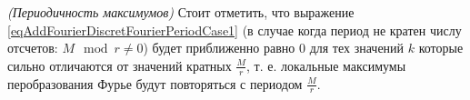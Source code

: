 \begin{remark}
\emph{(Периодичность максимумов)}
\label{rem:dsp:fourier:periodprop}
Стоит отметить, что выражение 
\eqref{eqAddFourierDiscretFourierPeriodCase1} (в случае когда
период не кратен числу отсчетов: $M \mod r \ne 0$) будет приближенно
равно 0 для тех значений $k$ которые сильно отличаются от значений
кратных $\frac{M}{r}$, т. е. локальные максимумы перобразования Фурье
будут повторяться с периодом $\frac{M}{r}$.
\end{remark}

